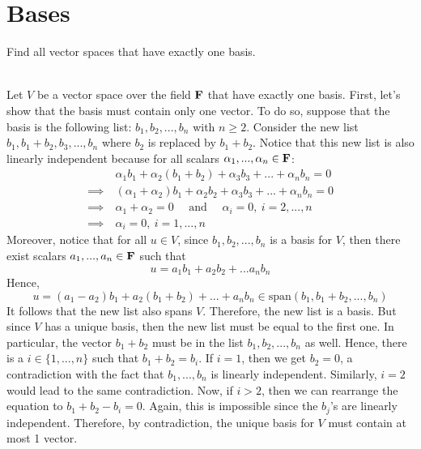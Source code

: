 \section{Bases}

\begin{exercise}
    Find all vector spaces that have exactly one basis. \\
\end{exercise}

\begin{solution}
    \\ Let $V$ be a vector space over the field $\mathbf{F}$ that have exactly one basis. First, let's show that the basis must contain only one vector. To do so, suppose that the basis is the following list: $b_1, b_2, ..., b_n$ with $n \geq 2$. Consider the new list $b_1, b_1 + b_2, b_3, ..., b_n$ where $b_2$ is replaced by $b_1 + b_2$. Notice that this new list is also linearly independent because for all scalars $\alpha_1, ..., \alpha_n \in \mathbf{F}$:
    \begin{align*}
        &\alpha_1 b_1 + \alpha_2 (b_1 + b_2) + \alpha_3 b_3 + ... + \alpha_n b_n = 0 \\
        \implies \ & (\alpha_1 + \alpha_2)b_1 + \alpha_2 b_2 + \alpha_3 b_3 + ... + \alpha_n b_n = 0 \\
        \implies \ & \alpha_1 + \alpha_2 = 0 \quad \text{ and } \quad  \alpha_i = 0, \ i=2, ..., n \\
        \implies \ & \alpha_i = 0, \ i=1, ..., n
    \end{align*}
    Moreover, notice that for all $u \in V$, since $b_1, b_2, ..., b_n$ is a basis for $V$, then there exist scalars $a_1, ..., a_n \in \mathbf{F}$ such that
    $$u = a_1 b_1 + a_2 b_2 + ... a_n b_n$$
    Hence,
    $$u = (a_1 - a_2)b_1 + a_2(b_1 + b_2)  + ... + a_n b_n \in \text{span}(b_1, b_1+b_2, ..., b_n)$$
    It follows that the new list also spans $V$. Therefore, the new list is a basis. But since $V$ has a unique basis, then the new list must be equal to the first one. In particular, the vector $b_1 + b_2$ must be in the list $b_1, b_2, ..., b_n$ as well. Hence, there is a $i \in \{1, ..., n\}$ such that $b_1 + b_2 = b_i$. If $i=1$, then we get $b_2 = 0$, a contradiction with the fact that $b_1, ..., b_n$ is linearly independent. Similarly, $i=2$ would lead to the same contradiction. Now, if $i > 2$, then we can rearrange the equation to $b_1 + b_2 - b_i = 0$. Again, this is impossible since the $b_j$'s are linearly independent. Therefore, by contradiction, the unique basis for $V$ must contain at most 1 vector.\\

\end{solution}
